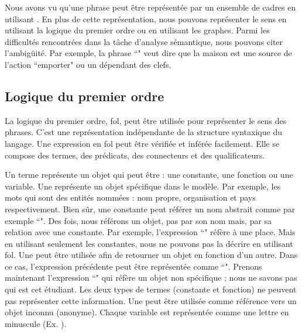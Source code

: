 \documentclass{KodeBook}
\begin{document}
Nous avons vu qu'une phrase peut être représentée par un ensemble de cadres en utilisant . 
En plus de cette représentation, nous pouvons représenter le sens en utilisant la logique du premier ordre ou en utilisant les graphes. 
Parmi les difficultés rencontrées dans la tâche d'analyse sémantique, nous pouvons citer l'ambigüité.
Par exemple, la phrase ``" veut dire que la maison est une source de l'action ``emporter" ou un dépendant des clefs. 

\subsection{Logique du premier ordre}

La logique du premier ordre, \ac{fol}, peut être utilisée pour représenter le sens des phrases.
C'est une représentation indépendante de la structure syntaxique du langage.
Une expression en \ac{fol} peut être vérifiée et inférée facilement.
Elle se compose des termes, des prédicats, des connecteurs et des qualificateurs. 

Un terme représente un objet qui peut être : une constante, une fonction ou une variable. 
Une  représente un objet spécifique dans le modèle.
Par exemple, les mots  qui sont des entités nommées  : nom propre, organisation et pays respectivement.
Bien sûr, une constante peut référer un nom abstrait comme par exemple ``".
Des fois, nous référons un objet, pas par son nom mais, par sa relation avec une constante. 
Par exemple, l'expression ``" réfère à une place. 
Mais en utilisant seulement les constantes, nous ne pouvons pas la décrire en utilisant \ac{fol}. 
Une  peut être utilisée afin de retourner un objet en fonction d'un autre. 
Dans ce cas, l'expression précédente peut être représentée comme ``". 
Prenons maintenant l'expression ``" qui réfère un objet non spécifique ; nous ne savons pas qui est cet étudiant. 
Les deux types de termes (constante et fonction) ne peuvent pas représenter cette information. 
Une  peut être utilisée comme référence vers un objet inconnu (anonyme). 
Chaque variable est représentée comme une lettre en minuscule (Ex. ).
\end{document}
